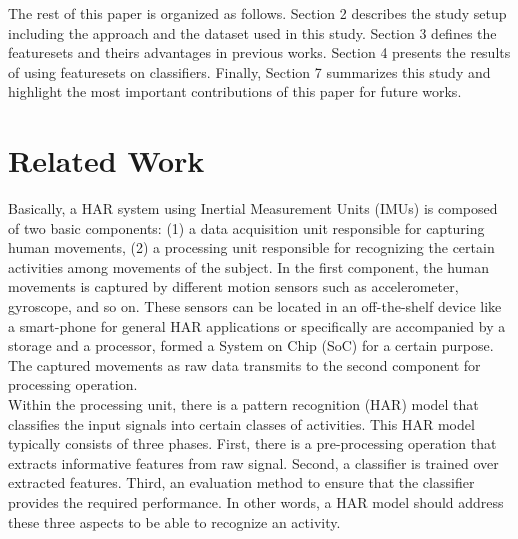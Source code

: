 \documentclass[journal,article,submit,moreauthors,pdftex]{Definitions/mdpi}
\begin{document}
The rest of this paper is organized as follows. Section 2 describes the study setup including the approach and the dataset used in this study. Section 3 defines the featuresets and theirs advantages in previous works. Section 4 presents the results of using featuresets on classifiers. Finally, Section 7 summarizes this study and highlight the most important contributions of this paper for future works.
\section{Related Work}




Basically, a HAR system using Inertial Measurement Units (IMUs) is composed of two basic components: (1) a data acquisition unit responsible for capturing human movements, (2) a processing unit responsible for recognizing the certain activities among movements of the subject\cite{rosati2018comparison}. In the first component, the human movements is captured by different motion sensors such as accelerometer, gyroscope, and so on. These sensors can be located in an off-the-shelf device like a smart-phone for general HAR applications or specifically are accompanied by a storage and a processor, formed a System on Chip (SoC) for a certain purpose. The captured movements as raw data transmits to the second component for processing operation.\\
Within the processing unit, there is a pattern recognition (HAR) model that classifies the input signals into certain classes of activities. This HAR model typically consists of three phases. First, there is a pre-processing operation that extracts informative features from raw signal. Second, a classifier is trained over extracted features. Third, an evaluation method to ensure that the classifier provides the required performance\cite{kolodziej2019registration}. In other words, a HAR model should address these three aspects to be able to recognize an activity.
\end{document}
